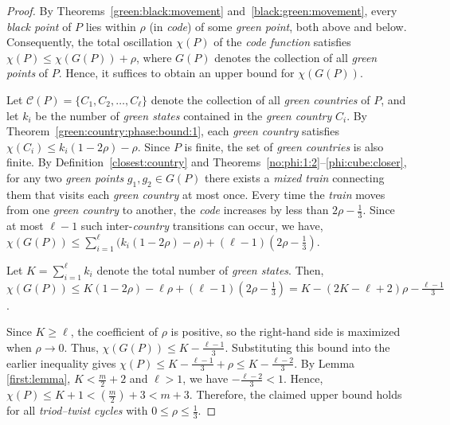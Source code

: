 \documentclass[12pt,reqno]{amsart}
\theoremstyle{definition}
\theoremstyle{remark}
\theoremstyle{assumption}
\numberwithin{equation}{section}
\begin{document}
\begin{proof}
	By Theorems~\ref{green:black:movement} and~\ref{black:green:movement}, 
	every \emph{black point} of $P$ lies within $\rho$ (in \emph{code}) of some \emph{green point}, 
	both above and below.  Consequently, the total 
	oscillation $\chi(P)$ of the \emph{code function} satisfies $	\chi(P) \leqslant  \chi(G(P)) + \rho$, where $G(P)$ denotes the collection of  all \emph{green points} of $P$. 
	Hence, it suffices to obtain an upper bound for $\chi(G(P))$.
	
	Let $\mathcal{C}(P) = \{C_1, C_2, \dots, C_{\ell}\}$ denote the collection 
	of all \emph{green countries} of $P$, and let $k_i$ be the number of 
	\emph{green states} contained in the \emph{green country} $C_i$. By Theorem~\ref{green:country:phase:bound:1},
	each \emph{green country} satisfies $\chi(C_i) \leqslant  k_i(1 - 2\rho) - \rho$.	Since $P$ is finite, the set of \emph{green countries} is also finite. 
	By Definition~\ref{closest:country} and Theorems~\ref{no:phi:1:2}–\ref{phi:cube:closer},
	for any two \emph{green points} $g_1, g_2 \in G(P)$ there exists a 
	\emph{mixed train} connecting them that visits each \emph{green country} 
	at most once. Every time the \emph{train} moves from one \emph{green country} to another, 
	the \emph{code} increases by less than $2\rho - \tfrac{1}{3}$. 
	Since at most $\ell - 1$ such inter-\emph{country} transitions can occur, we have, 	$	\chi(G(P))	\leqslant  \displaystyle  \sum_{i=1}^{\ell} \big(k_i(1 - 2\rho) - \rho\big)
	+ (\ell - 1)\!\left(2\rho - \frac{1}{3}\right)$.
	
	Let $K = \displaystyle  \sum_{i=1}^{\ell} k_i$ denote the total number of \emph{green states}. 
	Then, $\chi(G(P)) \leqslant K(1 - 2\rho) - \ell\rho + (\ell - 1)\!\left(2\rho - \frac{1}{3}\right) = K - (2K - \ell + 2)\rho - \frac{\ell - 1}{3}$.

	Since $K \geqslant  \ell$, the coefficient of $\rho$ is positive, 
	so the right-hand side is maximized when $\rho \to 0$. 
	Thus, $\chi(G(P)) \leqslant  K - \frac{\ell - 1}{3}$.  Substituting this bound into the earlier inequality gives $	\chi(P) \leqslant K - \frac{\ell - 1}{3} + \rho \leqslant  K - \frac{\ell - 2}{3}$. By Lemma \ref{first:lemma}, $K <   \frac{m}{2} + 2$ and $\ell > 1$, we have  $-\tfrac{\ell - 2}{3} <  1$. Hence, $\chi(P) \leqslant K + 1 <  (\frac{m}{2}) + 3 < m + 3$. Therefore, the claimed upper bound holds for all \emph{triod–twist cycles} 	with $0 \leqslant \rho \leqslant \tfrac{1}{3}$. 
\end{proof}
\end{document}
